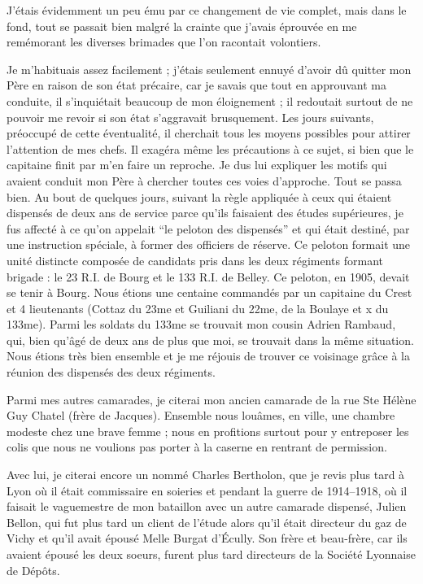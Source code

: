 \documentclass[11pt,a4paper]{report}
\begin{document}
J'étais évidemment un peu ému par ce changement de vie complet, mais dans le fond, tout se passait bien malgré la crainte que j'avais éprouvée en me remémorant les diverses brimades que l'on racontait volontiers.

Je m'habituais assez facilement ; j'étais seulement ennuyé d'avoir dû quitter mon Père en raison de son état précaire, car je savais que tout en approuvant ma conduite, il s'inquiétait beaucoup de mon éloignement ; il redoutait surtout de ne pouvoir me revoir si son état s'aggravait brusquement. Les jours suivants, préoccupé de cette éventualité, il cherchait tous les moyens possibles pour attirer l'attention de mes chefs. Il exagéra même les précautions à ce sujet, si bien que le capitaine finit par m'en faire un reproche. Je dus lui expliquer les motifs qui avaient conduit mon Père à chercher toutes ces voies d'approche. Tout se passa bien. Au bout de quelques jours, suivant la règle appliquée à ceux qui étaient dispensés de deux ans de service parce qu'ils faisaient des études supérieures, je fus affecté à ce qu'on appelait ``le peloton des dispensés'' et qui était destiné, par une instruction spéciale, à former des officiers de réserve. Ce peloton formait une unité distincte composée de candidats pris dans les deux régiments formant brigade : le 23 R.I. de Bourg et le 133 R.I. de Belley. Ce peloton, en 1905, devait se tenir à Bourg. Nous étions une centaine commandés par un capitaine du Crest et 4 lieutenants (Cottaz du 23me et Guiliani du 22me, de la Boulaye et x du 133me). Parmi les soldats du 133me se trouvait mon cousin Adrien Rambaud, qui, bien qu'âgé de deux ans de plus que moi, se trouvait dans la même situation. Nous étions très bien ensemble et je me réjouis de trouver ce voisinage grâce à la réunion des dispensés des deux régiments.

Parmi mes autres camarades, je citerai mon ancien camarade de la rue Ste Hélène Guy Chatel (frère de Jacques). Ensemble nous louâmes, en ville, une chambre modeste chez une brave femme ; nous en profitions surtout pour y entreposer les colis que nous ne voulions pas porter à la caserne en rentrant de permission.

Avec lui, je citerai encore un nommé Charles Bertholon, que je revis plus tard à Lyon où il était commissaire en soieries et pendant la guerre de 1914--1918, où il faisait le vaguemestre de mon bataillon avec un autre camarade dispensé, Julien Bellon, qui fut plus tard un client de l'étude alors qu'il était directeur du gaz de Vichy et qu'il avait épousé Melle Burgat d'Écully. Son frère et beau-frère, car ils avaient épousé les deux soeurs, furent plus tard directeurs de la Société Lyonnaise de Dépôts.
\end{document}
